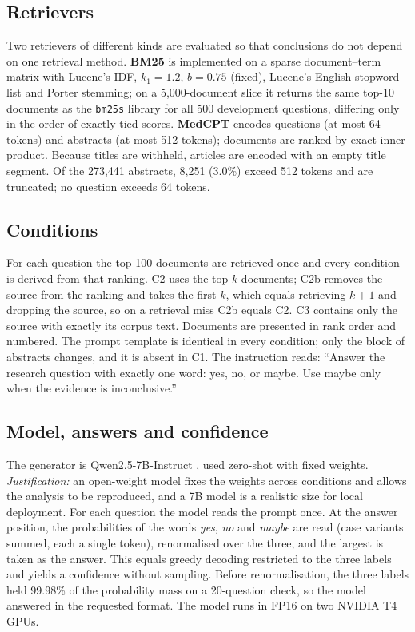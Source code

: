 \documentclass[conference]{IEEEtran}
\begin{document}
\subsection{Retrievers}
Two retrievers of different kinds are evaluated so that conclusions do not depend
on one retrieval method. \textbf{BM25} \cite{robertson2009bm25} is implemented on
a sparse document--term matrix with Lucene's IDF, $k_1=1.2$, $b=0.75$ (fixed),
Lucene's English stopword list and Porter stemming; on a 5{,}000-document slice it
returns the same top-10 documents as the \texttt{bm25s} library for all 500
development questions, differing only in the order of exactly tied scores.
\textbf{MedCPT} \cite{jin2023medcpt} encodes questions (at most 64 tokens) and
abstracts (at most 512 tokens); documents are ranked by exact inner product.
Because titles are withheld, articles are encoded with an empty title segment.
Of the 273{,}441 abstracts, 8{,}251 (3.0\%) exceed 512 tokens and are truncated;
no question exceeds 64 tokens.

\subsection{Conditions}
For each question the top 100 documents are retrieved once and every condition
is derived from that ranking. C2 uses the top $k$ documents; C2b removes the
source from the ranking and takes the first $k$, which equals retrieving $k{+}1$
and dropping the source, so on a retrieval miss C2b equals C2. C3 contains only
the source with exactly its corpus text. Documents are presented in rank order
and numbered. The prompt template is identical in every condition; only the
block of abstracts changes, and it is absent in C1. The instruction reads:
``Answer the research question with exactly one word: yes, no, or maybe. Use
maybe only when the evidence is inconclusive.''

\subsection{Model, answers and confidence}
The generator is Qwen2.5-7B-Instruct \cite{qwen2024qwen25}, used zero-shot with
fixed weights. \emph{Justification:} an open-weight model fixes the weights across
conditions and allows the analysis to be reproduced, and a 7B model is a
realistic size for local deployment. For each question the model reads the
prompt once. At the answer position, the probabilities of the words \emph{yes},
\emph{no} and \emph{maybe} are read (case variants summed, each a single token),
renormalised over the three, and the largest is taken as the answer. This equals
greedy decoding restricted to the three labels and yields a confidence without
sampling. Before renormalisation, the three labels held 99.98\% of the
probability mass on a 20-question check, so the model answered in the requested
format. The model runs in FP16 on two NVIDIA T4 GPUs.
\end{document}
